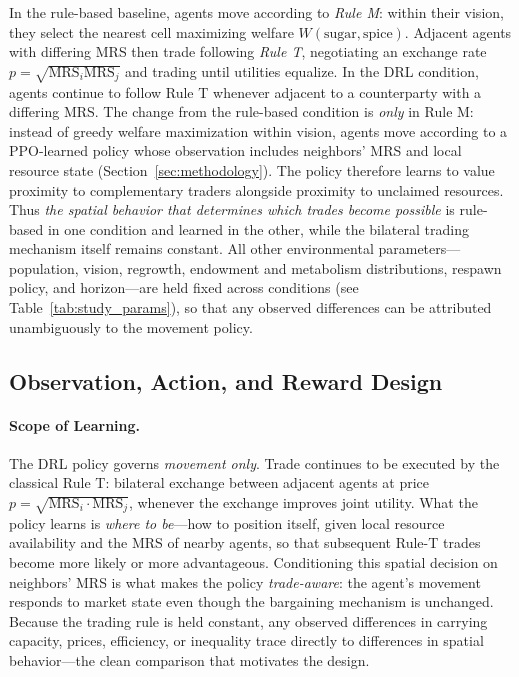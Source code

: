 \documentclass[pdflatex,sn-mathphys-num]{sn-jnl}%
\theoremstyle{thmstyleone}%
\theoremstyle{thmstyletwo}%
\theoremstyle{thmstylethree}%
\begin{document}
In the rule-based baseline, agents move according to \textit{Rule M}: within their vision, they select the nearest cell maximizing welfare \(W(\text{sugar}, \text{spice})\).  
Adjacent agents with differing MRS then trade following \textit{Rule T}, negotiating an exchange rate \(p=\sqrt{\text{MRS}_i\text{MRS}_j}\) and trading until utilities equalize.
In the DRL condition, agents continue to follow Rule T whenever adjacent to a counterparty with a differing MRS.  
The change from the rule-based condition is \emph{only} in Rule M: instead of greedy welfare maximization within vision, agents move according to a PPO-learned policy whose observation includes neighbors' MRS and local resource state (Section~\ref{sec:methodology}).  
The policy therefore learns to value proximity to complementary traders alongside proximity to unclaimed resources.  
Thus \emph{the spatial behavior that determines which trades become possible} is rule-based in one condition and learned in the other, while the bilateral trading mechanism itself remains constant.
All other environmental parameters---population, vision, regrowth, endowment and metabolism distributions, respawn policy, and horizon---are held fixed across conditions (see Table~\ref{tab:study_params}), so that any observed differences can be attributed unambiguously to the movement policy.

\subsection{Observation, Action, and Reward Design}

\paragraph{Scope of Learning.}
The DRL policy governs \emph{movement only}.
Trade continues to be executed by the classical Rule T: bilateral exchange between adjacent agents at price $p = \sqrt{\text{MRS}_i \cdot \text{MRS}_j}$, whenever the exchange improves joint utility.
What the policy learns is \emph{where to be}---how to position itself, given local resource availability and the MRS of nearby agents, so that subsequent Rule-T trades become more likely or more advantageous.
Conditioning this spatial decision on neighbors' MRS is what makes the policy \emph{trade-aware}: the agent's movement responds to market state even though the bargaining mechanism is unchanged.
Because the trading rule is held constant, any observed differences in carrying capacity, prices, efficiency, or inequality trace directly to differences in spatial behavior---the clean comparison that motivates the design.
\end{document}
